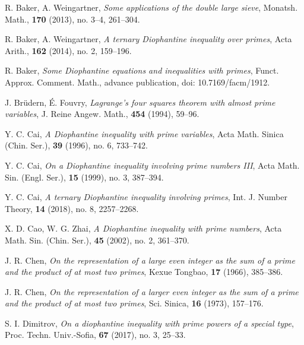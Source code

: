 \documentclass[a4paper,oneside,11pt]{article}%
\numberwithin{equation}{section}
\begin{document}
\begin{thebibliography}{99}

R. Baker, A. Weingartner, \textit{Some applications of the double large sieve},
                                        Monatsh. Math.,  \textbf{170} (2013), no. 3--4, 261--304.

R. Baker, A. Weingartner, \textit{A ternary Diophantine inequality over primes},
                                        Acta Arith., \textbf{162} (2014), no. 2, 159--196.

R. Baker, \textit{Some Diophantine equations and inequalities with primes},
                            Funct. Approx. Comment. Math., advance publication, doi: 10.7169/facm/1912.

J. Br\"{u}dern, \'{E}. Fouvry, \textit{Lagrange's four squares theorem with almost
                               prime variables}, J. Reine Angew. Math., \textbf{454} (1994), 59--96.

Y. C. Cai, \textit{A Diophantine inequality with prime variables},
                              Acta Math. Sinica (Chin. Ser.), \textbf{39} (1996), no. 6, 733--742.

Y. C. Cai, \textit{On a Diophantine inequality involving prime numbers III},
                              Acta Math. Sin. (Engl. Ser.), \textbf{15} (1999), no. 3, 387--394.

Y. C. Cai, \textit{A ternary Diophantine inequality involving primes},
                              Int. J. Number Theory, \textbf{14} (2018), no. 8, 2257--2268.

X. D. Cao, W. G. Zhai, \textit{A Diophantine inequality with prime numbers},
                              Acta Math. Sin. (Chin. Ser.), \textbf{45} (2002), no. 2, 361--370.

J. R. Chen, \textit{On the representation of a large even integer as the sum of a prime and the
                              product of at most two primes}, Kexue Tongbao, \textbf{17} (1966), 385--386.

J. R. Chen, \textit{On the representation of a larger even integer as the sum of a prime and the
                              product of at most two primes}, Sci. Sinica, \textbf{16} (1973), 157--176.

S. I. Dimitrov, \textit{On a diophantine inequality with prime powers of a special type},
                              Proc. Techn. Univ.-Sofia, \textbf{67} (2017), no. 3, 25--33.


\end{thebibliography}
\end{document}
